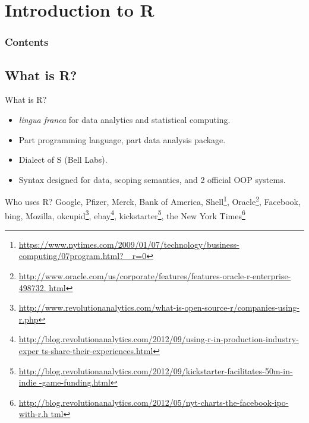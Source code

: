 \section{Introduction to R}

\hidenum
\begin{frame}[noframenumbering]
  \frametitle{Contents}
  \tableofcontents[currentsection,hideothersubsections,sectionstyle=show/hide]
\end{frame}
\shownum

\subsection{What is R?}

\begin{frame}
  \begin{block}{What is R?}\pause
    \begin{itemize}[<+-|alert@+>]
    \item \emph{lingua franca} for data analytics and statistical
      computing.
    \item Part programming language, part data analysis package.
    \item Dialect of S (Bell Labs).
    \item Syntax designed for data, scoping semantics, and 2 official
      OOP systems.
    \end{itemize}
  \end{block}
\end{frame}

\begin{frame}
  \begin{block}{Who uses R?}\pause
    Google, Pfizer, Merck, Bank of America, Shell\footnote{\url{
        https://www.nytimes.com/2009/01/07/technology/business-computing/07program.html?
        _r=0}}, Oracle\footnote{\url{
        http://www.oracle.com/us/corporate/features/features-oracle-r-enterprise-498732.
        html}}, Facebook, bing, Mozilla, okcupid\footnote{\url{
        http://www.revolutionanalytics.com/what-is-open-source-r/companies-using-r.php}},
    ebay\footnote{\url{
        http://blog.revolutionanalytics.com/2012/09/using-r-in-production-industry-exper
        ts-share-their-experiences.html}}, kickstarter\footnote{\url{
        http://blog.revolutionanalytics.com/2012/09/kickstarter-facilitates-50m-in-indie
        -game-funding.html}}, the New York Times\footnote{\url{
        http://blog.revolutionanalytics.com/2012/05/nyt-charts-the-facebook-ipo-with-r.h
        tml}}
  \end{block}
\end{frame}

